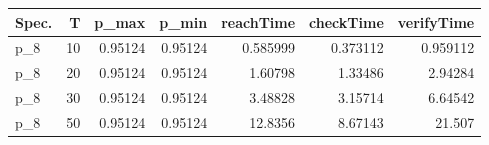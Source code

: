 \begin{tabular}{lrrrrrr}
\hline
 Spec.   &   T &   p\_max &   p\_min &   reachTime &   checkTime &   verifyTime \\
\hline
 p\_8     &  10 & 0.95124 & 0.95124 &    0.585999 &    0.373112 &     0.959112 \\
 p\_8     &  20 & 0.95124 & 0.95124 &    1.60798  &    1.33486  &     2.94284  \\
 p\_8     &  30 & 0.95124 & 0.95124 &    3.48828  &    3.15714  &     6.64542  \\
 p\_8     &  50 & 0.95124 & 0.95124 &   12.8356   &    8.67143  &    21.507    \\
\hline
\end{tabular}
